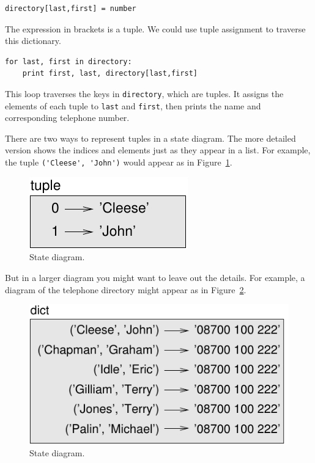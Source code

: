 \documentclass[10pt]{book}
\begin{document}
\begin{CJK}{UTF8}{gbsn}
\begin{verbatim}
directory[last,first] = number
\end{verbatim}
%
The expression in brackets is a tuple.  We could use tuple
assignment to traverse this dictionary.

\begin{verbatim}
for last, first in directory:
    print first, last, directory[last,first]
\end{verbatim}
%
This loop traverses the keys in {\tt directory}, which are tuples.  It
assigns the elements of each tuple to {\tt last} and {\tt first}, then
prints the name and corresponding telephone number.

There are two ways to represent tuples in a state diagram.  The more
detailed version shows the indices and elements just as they appear in
a list.  For example, the tuple \verb"('Cleese', 'John')" would appear
as in Figure~\ref{fig.tuple1}.

\begin{figure}
\centerline
{\includegraphics[scale=0.8]{figs/tuple1.pdf}}
\caption{State diagram.}
\label{fig.tuple1}
\end{figure}

But in a larger diagram you might want to leave out the
details.  For example, a diagram of the telephone directory might
appear as in Figure~\ref{fig.dict2}.

\begin{figure}
\centerline
{\includegraphics[scale=0.8]{figs/dict2.pdf}}
\caption{State diagram.}
\label{fig.dict2}
\end{figure}


\end{CJK}
\end{document}
